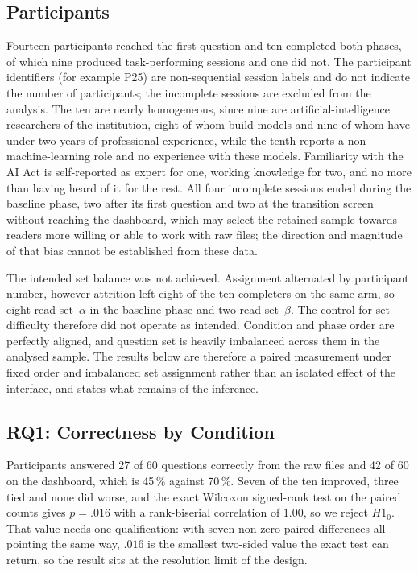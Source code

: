 \documentclass[10pt,conference]{IEEEtran}
\begin{document}
\subsection{Participants}
Fourteen participants reached the first question and ten completed both phases, of which nine produced task-performing sessions and one did not.
The participant identifiers (for example P25) are non-sequential session labels and do not indicate the number of participants; the incomplete sessions are excluded from the analysis.
The ten are nearly homogeneous, since nine are artificial-intelligence researchers of the institution, eight of whom build models and nine of whom have under two years of professional experience, while the tenth reports a non-machine-learning role and no experience with these models.
Familiarity with the AI Act is self-reported as expert for one, working knowledge for two, and no more than having heard of it for the rest.
All four incomplete sessions ended during the baseline phase, two after its first question and two at the transition screen without reaching the dashboard, which may select the retained sample towards readers more willing or able to work with raw files; the direction and magnitude of that bias cannot be established from these data.

The intended set balance was not achieved.
Assignment alternated by participant number, however attrition left eight of the ten completers on the same arm, so eight read set~$\alpha$ in the baseline phase and two read set~$\beta$.
The control for set difficulty therefore did not operate as intended.
Condition and phase order are perfectly aligned, and question set is heavily imbalanced across them in the analysed sample.
The results below are therefore a paired measurement under fixed order and imbalanced set assignment rather than an isolated effect of the interface, and  states what remains of the inference.

\subsection{RQ1: Correctness by Condition}
Participants answered 27 of 60 questions correctly from the raw files and 42 of 60 on the dashboard, which is 45\,\% against 70\,\%.
Seven of the ten improved, three tied and none did worse, and the exact Wilcoxon signed-rank test on the paired counts gives $p = .016$ with a rank-biserial correlation of $1.00$, so we reject $H1_0$.
That value needs one qualification: with seven non-zero paired differences all pointing the same way, $.016$ is the smallest two-sided value the exact test can return, so the result sits at the resolution limit of the design.
\end{document}
